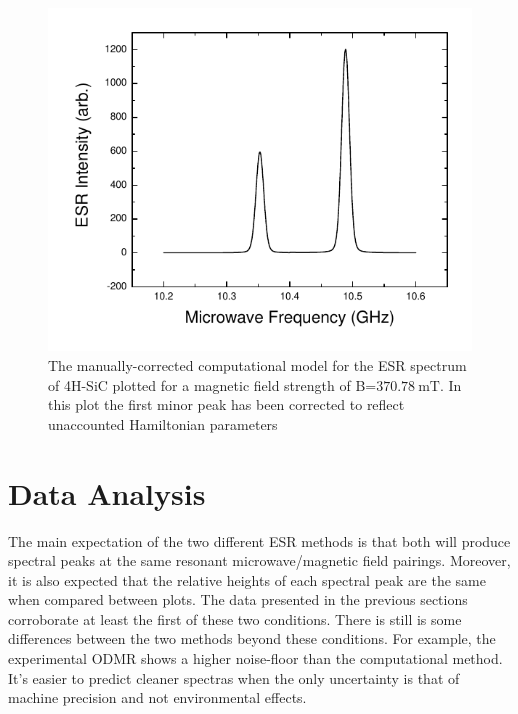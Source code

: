 \documentclass[oneside, noacknowlegments]{BYUPhys}
\begin{document}
\begin{figure}[H]
    \centerline{\includegraphics{p14-esr}}
    \caption[ESR Computational Model for SiC]{\label{fig:SiCModelCorrected}
     The manually-corrected computational model for the ESR spectrum of 4H-SiC plotted for a magnetic field strength of B=$370.78~\text{mT}$. In this plot the first minor peak has been corrected to reflect unaccounted Hamiltonian parameters}
 \end{figure}

\section{Data Analysis}

The main expectation of the two different ESR methods is that both will produce spectral peaks at the same resonant microwave/magnetic field pairings. Moreover, it is also expected that the relative heights of each spectral peak are the same when compared between plots. The data presented in the previous sections corroborate at least the first of these two conditions. There is still is some differences between the two methods beyond these conditions. For example, the experimental ODMR shows a higher noise-floor than the computational method. It's easier to predict cleaner spectras when the only uncertainty is that of machine precision and not environmental effects.
\end{document}
